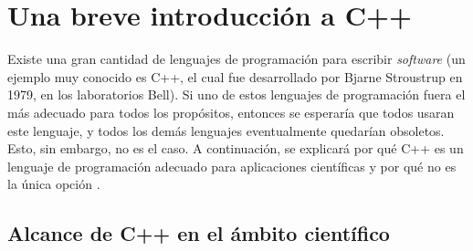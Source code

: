 \section{Una breve introducción a C++}
Existe una gran cantidad de lenguajes de programación para escribir \textit{software} (un ejemplo muy conocido es C++, el cual fue desarrollado por Bjarne Stroustrup en 1979, en los laboratorios Bell). Si uno de estos lenguajes de programación fuera el más adecuado para todos los propósitos, entonces se esperaría que todos usaran este lenguaje, y todos los demás lenguajes eventualmente quedarían obsoletos. Esto, sin embargo, no es el caso. A continuación, se explicará por qué C++ es un lenguaje de programación adecuado para aplicaciones científicas y por qué no es la única opción \cite{Pitt2017}.

\subsection{Alcance de C++ en el ámbito científico}

